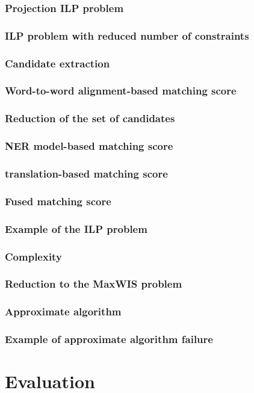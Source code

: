 \documentclass{beamer}
\begin{document}
\begin{frame}
  \frametitle{Projection ILP problem}
\end{frame}

\begin{frame}
  \frametitle{ILP problem with reduced number of constraints}
\end{frame}

\begin{frame}
  \frametitle{Candidate extraction}
\end{frame}

\begin{frame}
  \frametitle{Word-to-word alignment-based matching score}
\end{frame}

\begin{frame}
  \frametitle{Reduction of the set of candidates}
\end{frame}

\begin{frame}
  \frametitle{NER model-based matching score}
\end{frame}

\begin{frame}
  \frametitle{translation-based matching score}
\end{frame}

\begin{frame}
  \frametitle{Fused matching score}
\end{frame}

\begin{frame}
  \frametitle{Example of the ILP problem}
\end{frame}

\begin{frame}
  \frametitle{Complexity}
\end{frame}

\begin{frame}
  \frametitle{Reduction to the MaxWIS problem}
\end{frame}

\begin{frame}
  \frametitle{Approximate algorithm}
\end{frame}

\begin{frame}
  \frametitle{Example of approximate algorithm failure}
\end{frame}

\section{Evaluation}
\end{document}
